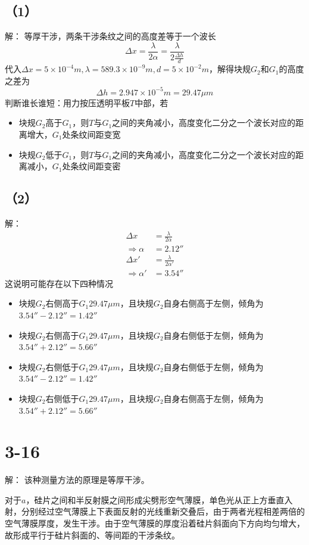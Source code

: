 \documentclass[10pt,a4paper]{article}
\begin{document}
\subsection*{（1）}解：
等厚干涉，两条干涉条纹之间的高度差等于一个波长
\[
\Delta x = \frac{\lambda}{2\alpha} = \frac{\lambda}{2\frac{\Delta h}{d}}
\]
代入$\Delta x = 5\times10^{-4}m, \lambda = 589.3\times10^{-9}m, d = 5\times10^{-2}m$，解得块规$G_2$和$G_1$的高度之差为
\[
\Delta h = 2.947\times10^{-5}m = 29.47\mu m
\]
判断谁长谁短：用力按压透明平板$T$中部，若
\begin{itemize}
  \item 块规$G_2$高于$G_1$，则$T$与$G_1$之间的夹角减小，高度变化二分之一个波长对应的距离增大，$G_1$处条纹间距变宽
  \item 块规$G_2$低于$G_1$，则$T$与$G_1$之间的夹角减小，高度变化二分之一个波长对应的距离减小，$G_1$处条纹间距变密
\end{itemize}
\subsection*{（2）}解：
\begin{align*}
\Delta x &= \frac{\lambda}{2\alpha}\\
\Longrightarrow \alpha &= 2.12''\\
\Delta x' &= \frac{\lambda}{2\alpha'}\\
\Longrightarrow \alpha' &= 3.54''
\end{align*}
这说明可能存在以下四种情况
\begin{itemize}
  \item 块规$G_2$右侧高于$G_1$$29.47\mu m$，且块规$G_2$自身右侧高于左侧，倾角为$3.54'' - 2.12'' = 1.42''$
  \item 块规$G_2$右侧高于$G_1$$29.47\mu m$，且块规$G_2$自身右侧低于左侧，倾角为$3.54'' + 2.12'' = 5.66''$
  \item 块规$G_2$右侧低于$G_1$$29.47\mu m$，且块规$G_2$自身右侧低于左侧，倾角为$3.54'' - 2.12'' = 1.42''$
  \item 块规$G_2$右侧低于$G_1$$29.47\mu m$，且块规$G_2$自身右侧高于左侧，倾角为$3.54'' + 2.12'' = 5.66''$
\end{itemize}
\section*{3-16}解：
该种测量方法的原理是等厚干涉。

对于$a$，硅片之间和半反射膜之间形成尖劈形空气薄膜，单色光从正上方垂直入射，分别经过空气薄膜上下表面反射的光线重新交叠后，由于两者光程相差两倍的空气薄膜厚度，发生干涉。由于空气薄膜的厚度沿着硅片斜面向下方向均匀增大，故形成平行于硅片斜面的、等间距的干涉条纹。
\end{document}
